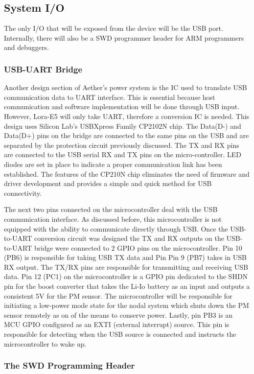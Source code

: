 \subsection{System I/O}
The only I/O that will be exposed from the device will be the USB port. Internally, there will also
be a SWD programmer header for ARM programmers and debuggers.

\subsubsection{USB-UART Bridge}
Another design section of Aether's power system is the IC used to translate USB communication data
to UART interface. This is essential because host communication and software implementation will be
done through USB input. However, Lora-E5 will only take UART, therefore a conversion IC is needed.
This design uses Silicon Lab's USBXpress Family CP2102N chip. The Data(D-) and Data(D+) pins on the
bridge are connected to the same pins on the USB and are separated by the protection circuit
previously discussed. The TX and RX pins are connected to the USB serial RX and TX pins on the
micro-controller. LED diodes are set in place to indicate a proper communication link has been
established. The features of the CP210N chip eliminates the need of firmware and driver development
and provides a simple and quick method for USB connectivity.

The next two pins connected on the microcontroller deal with the USB communication interface. As
discussed before, this microcontroller is not equipped with the ability to communicate directly
through USB. Once the USB-to-UART conversion circuit was designed the TX and RX outputs on the
USB-to-UART bridge were connected to 2 GPIO pins on the microcontroller. Pin 10 (PB6) is responsible
for taking USB TX data and Pin Pin 9 (PB7) takes in USB RX output. The TX/RX pins are responsible
for transmitting and receiving USB data. Pin 12 (PC1) on the microcontroller is a GPIO pin dedicated
to the SHDN pin for the boost converter that takes the Li-Io battery as an input and outputs
a consistent 5V for the PM sensor. The microcontroller will be responsible for initiating
a low-power mode state for the nodal system which shuts down the PM sensor remotely as on of the
means to conserve power. Lastly, pin PB3 is an MCU GPIO configured as an EXTI (external interrupt)
source. This pin is responsible for detecting when the USB source is connected and instructs the
microcontroller to wake up. 

\subsubsection{The SWD Programming Header}

